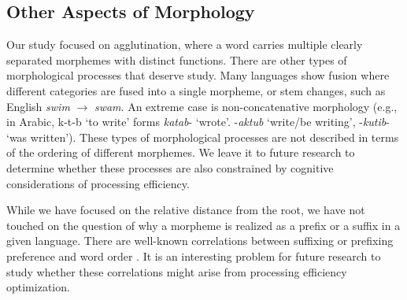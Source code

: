 \documentclass[11pt,letterpaper]{article}
\newcommand{\citep}{\parencite}
\begin{document}












\subsection{Other Aspects of Morphology}

Our study focused on agglutination, where a word carries multiple clearly separated morphemes with distinct functions.
There are other types of morphological processes that deserve study.
Many languages show fusion \citep{wals-20} where different categories are fused into a single morpheme, or stem changes, such as English \textit{swim} $\rightarrow$ \textit{swam}.
An extreme case is non-concatenative morphology (e.g., in Arabic, k-t-b `to write' forms \textit{katab}- `wrote'. -\textit{aktub} `write/be writing', -\textit{kutib}- `was written').
These types of morphological processes are not described in terms of the ordering of different morphemes.
We leave it to future research to determine whether these processes are also constrained by cognitive considerations of processing efficiency.

While we have focused on the relative distance from the root, we have not touched on the question of why a morpheme is realized as a prefix or a suffix in a given language.
There are well-known correlations between suffixing or prefixing preference and word order \citep{greenberg1963universals}.
It is an interesting problem for future research to study whether these correlations might arise from processing efficiency optimization.
\end{document}
